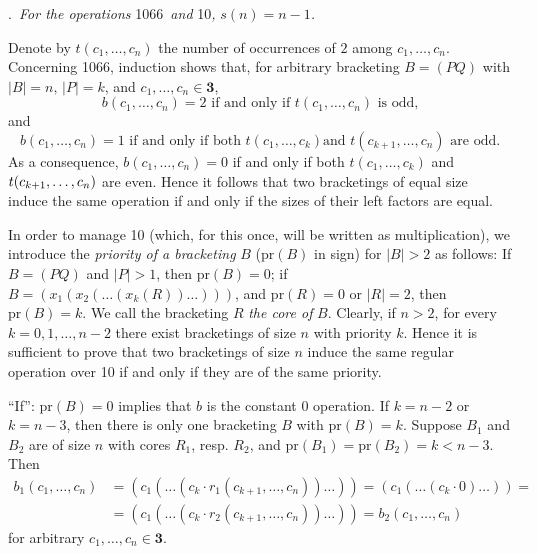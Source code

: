 \documentclass[a4paper,reqno]{amsart}\usepackage{amssymb,latexsym}
\theoremstyle{definition}
\theoremstyle{remark}
\numberwithin{equation}{section}
\numberwithin{theorem}{section}
\begin{document}
\bigskip

.\textit{\ For the operations }1066\textit{\ and }10\textit{,
}$s(n)=n-1$\textit{.}

\smallskip

Denote by $t(c_{1},\ldots,c_{n})$ the number of occurrences of $2$ among
$c_{1},\ldots,c_{n}$. Concerning 1066, induction shows that, for arbitrary
bracketing $B=(PQ)$ with $|B|=n,\,|P|=k$, and $c_{1},\ldots,c_{n}\in
\mathbf{3}$,
\[
b(c_{1},\ldots,c_{n})=2\text{ if and only if }t(c_{1},\ldots,c_{n})\text{ is
odd,}\]
and
\[
b(c_{1},\ldots,c_{n})=1\text{ if and only if both }t(c_{1},\ldots,c_{k})\text{
and }t(c_{k+1},\ldots,c_{n})\text{ are odd.}\]
As a consequence, $b(c_{1},\ldots,c_{n})=0$ if and only if both $t(c_{1},\ldots,c_{k})$ and $\linebreak t(c_{k+1},\ldots,c_{n})$ are even. Hence it
follows that two bracketings of equal size induce the same operation if and
only if the sizes of their left factors are equal.

\smallskip

In order to manage 10 (which, for this once, will be written as
multiplication), we introduce the \textit{priority of a bracketing} $B$
($\mathrm{pr}(B)$ in sign) for $|B|>2$ as follows: If $B=(PQ)$ and $|P|>1$,
then $\mathrm{pr}(B)=0$; if $B=(x_{1}(x_{2}(\ldots(x_{k}(R))\ldots)))$, and
$\mathrm{pr}(R)=0$ or $|R|=2$, then $\mathrm{pr}(B)=k$. We call the bracketing
$R$ \textit{the core of} $B$. Clearly, if $n>2$, for every $k=0,1,\ldots,n-2$
there exist bracketings of size $n$ with priority $k$. Hence it is sufficient
to prove that two bracketings of size $n$ induce the same regular operation
over 10 if and only if they are of the same priority.

\textquotedblleft If\textquotedblright: $\mathrm{pr}(B)=0$ implies that $b$ is
the constant $0$ operation. If $k=n-2$ or $k=n-3$, then there is only one
bracketing $B$ with $\mathrm{pr}(B)=k$. Suppose $B_{1}$ and $B_{2}$ are of
size $n$ with cores $R_{1}$, resp. $R_{2}$, and $\mathrm{pr}(B_{1})=\mathrm{pr}(B_{2})=k<n-3$. Then\begin{align*}
b_{1}(c_{1},\ldots,c_{n})  &  =(c_{1}(\ldots(c_{k}\cdot r_{1}(c_{k+1},\ldots,c_{n}))\ldots))=(c_{1}(\ldots(c_{k}\cdot0)\ldots))=\\
&  =(c_{1}(\ldots(c_{k}\cdot r_{2}(c_{k+1},\ldots,c_{n}))\ldots))=b_{2}(c_{1},\ldots,c_{n})
\end{align*}
for arbitrary $c_{1},\ldots,c_{n}\in\mathbf{3}$.
\end{document}
